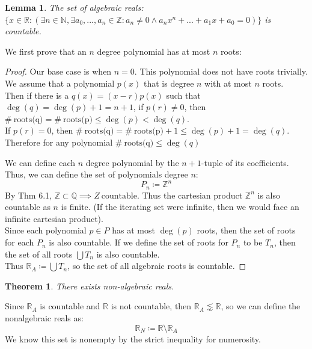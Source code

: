\documentclass{article}
\newtheorem{thm}{Theorem}[section]
\newtheorem{lem}{Lemma}[section]
\begin{document}
\medskip
\begin{lem}
The set of algebraic reals: $\{x \in \mathbb{R}: (\exists n \in \mathbb{N}, \exists a_0,...,a_n \in \mathbb{Z}: a_n \neq 0 \land a_nx^n +...+a_1x + a_0 = 0)\}$ is countable.
\end{lem}
We first prove that an $n$ degree polynomial has at most $n$ roots:
\begin{proof}
Our base case is when $n= 0$. This polynomial does not have roots trivially.\\

We assume that a polynomial $p(x)$ that is degree $n$ with at most $n$ roots.\\

Then if there is a $q(x) = (x- r)p(x)$ such that $\deg(q) = \deg(p) + 1 = n+1$, if $p(r) \neq 0$, then $\# \ \text{roots(q)} = \# \ \text{roots(p)} \leqslant \deg(p) < \deg(q)$.\\

If $p(r) = 0$, then $\# \ \text{roots(q)} = \# \ \text{roots(p)} + 1 \leqslant \deg(p) + 1 = \deg(q)$. Therefore for any polynomial $\# \ \text{roots(q)} \leqslant \deg(q)$

\vspace{6pt}

We can define each $n$ degree polynomial by the $n+1$-tuple of its coefficients. Thus, we can define the set of polynomials degree $n$:
\begin{equation*}
    P_n \coloneq \mathbb{Z}^n
\end{equation*}
By Thm 6.1, $\mathbb{Z} \subset \mathbb{Q} \implies Z \ \text{countable}$. Thus the cartesian product $\mathbb{Z}^n$ is also countable as $n$ is finite. (If the iterating set were infinite, then we would face an infinite cartesian product).\\

Since each polynomial $p \in P$ has at most $\deg(p)$ roots, then the set of roots for each $P_n$ is also countable. If we define the set of roots for $P_n$ to be $T_n$, then the set of all roots $\bigcup T_n$ is also countable.\\

Thus $\mathbb{R}_A \coloneq \bigcup T_n$, so the set of all algebraic roots is countable.
\end{proof}

\medskip
\begin{thm}
There exists non-algebraic reals.
\end{thm}
Since $\mathbb{R}_A$ is countable and $\mathbb{R}$ is not countable, then $\mathbb{R}_A \lnsim \mathbb{R}$, so we can define the nonalgebraic reals as:
\begin{equation*}
    \mathbb{R}_N \coloneq \mathbb{R} \setminus \mathbb{R}_A
\end{equation*}
We know this set is nonempty by the strict inequality for numerosity.
\end{document}
